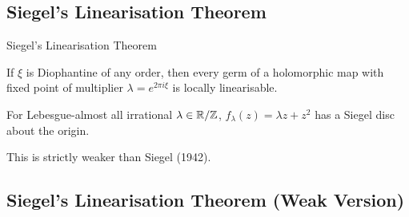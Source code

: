 \newcommand\altfm[1][$\dagger$]{\textsuperscript{#1}}
\newcommand\altft[2][$\dagger$]{\footnotesize{\altfm[#1] #2}}
\newcommand\altfr{\vfill\rule{16em}{0.4pt}\par}
\newcommand\by[1]{\text{\footnotesize{(#1)}}}

\subsection{Siegel's Linearisation Theorem}
\begin{frame}{Siegel's Linearisation Theorem}
\begin{theorem}[Siegel 1942]
If $\xi$ is Diophantine of any order, then every germ of a holomorphic map with fixed point of multiplier $\lambda = e^{2\pi i\xi}$ is locally linearisable.
\end{theorem}\pause

\begin{theorem}
For Lebesgue-almost all irrational $\lambda \in \mathbb{R}/\mathbb{Z}$, $f_\lambda(z) = \lambda z + z^2$ has a Siegel disc about the origin.
\end{theorem}

This is strictly weaker than Siegel (1942).
\end{frame}

\subsection{Siegel's Linearisation Theorem (Weak Version)}

